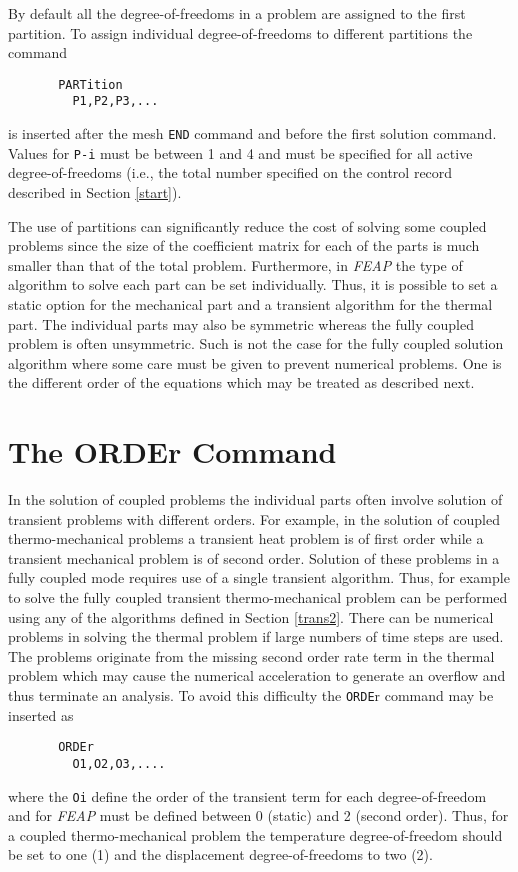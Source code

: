 By default all the 
degree-of-freedoms in a problem are assigned to the first partition.
To assign individual degree-of-freedoms to different partitions
the command
\begin{verbatim}
       PARTition
         P1,P2,P3,...
\end{verbatim}
is inserted after the mesh {\tt END} command and before the first solution
command.  Values for {\tt P-i} must be between 1 and 4
and must be specified for all active
degree-of-freedoms (i.e., the total number specified on the control 
record described in Section \ref{start}).

The use of partitions can significantly reduce the cost of solving some
coupled problems since the size of the coefficient matrix for each of the
parts is much smaller than that of the total problem.  Furthermore, in
{\sl FEAP} the type of algorithm to solve each part can be set individually.
Thus, it is possible to set a static option for the mechanical part and a
transient algorithm for the thermal part.  The individual parts may also
be symmetric whereas the fully coupled problem is often unsymmetric.
Such is not the case for the fully coupled solution algorithm where some
care must be given to prevent numerical problems.  One is the different
order of the equations which may be treated as described next.

\section{The ORDEr Command}
\label{order}

In the solution of coupled problems the individual parts often involve
solution of transient problems with different orders.
For example, in the solution of coupled thermo-mechanical problems a
transient heat problem is of first order while a transient mechanical
problem is of second order.  Solution of these problems in a fully
coupled mode requires use of a single transient algorithm.  Thus, for
example to solve the fully coupled transient thermo-mechanical problem
can be performed using any of the algorithms defined in Section \ref{trans2}.
There can be numerical problems in solving the thermal problem
if large numbers of time steps are used.  The problems originate from the
missing second order rate term in the thermal problem which may cause the
numerical acceleration to generate an overflow and thus terminate an
analysis.  To avoid this difficulty the {\tt ORDE}r command may be inserted
as
\begin{verbatim}
       ORDEr
         O1,O2,O3,....
\end{verbatim}
where the {\tt Oi} define the order of the transient term for each
degree-of-freedom and for {\sl FEAP} must be defined between 0 (static)
and 2 (second order).  Thus, for a coupled thermo-mechanical problem
the temperature degree-of-freedom should be set to one (1) and the
displacement degree-of-freedoms to two (2).
